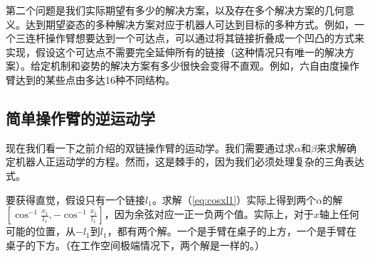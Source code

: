 第二个问题是我们实际期望有多少的解决方案，以及存在多个解决方案的几何意义。达到期望姿态的多种解决方案对应于机器人可达到目标的多种方式。例如，一个三连杆操作臂想要达到一个可达点，可以通过将其链接折叠成一个凹凸的方式来实现，假设这个可达点不需要完全延伸所有的链接（这种情况只有唯一的解决方案）。给定机制和姿势的解决方案有多少很快会变得不直观。例如，六自由度操作臂达到的某些点由多达16种不同结构。



\subsection{简单操作臂的逆运动学}
现在我们看一下之前介绍的双链操作臂的运动学。我们需要通过求$\alpha$和$\beta$来求解确定机器人正运动学的方程。然而，这是棘手的，因为我们必须处理复杂的三角表达式。

要获得直觉，假设只有一个链接$l_1$。求解（\ref{eq:cosxl1}）实际上得到两个$\alpha$的解$\left[\cos^{-1}\frac{x_1}{l_1},-\cos^{-1}\frac{x_1}{l_1}\right]$，因为余弦对应一正一负两个值。实际上，对于$x$轴上任何可能的位置，从$-l_1$到$l_1$，都有两个解。一个是手臂在桌子的上方，一个是手臂在桌子的下方。（在工作空间极端情况下，两个解是一样的。）


